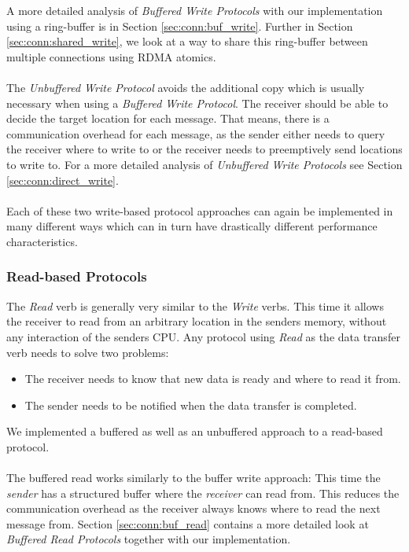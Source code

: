 A more detailed analysis of \emph{Buffered Write Protocols} with our implementation using a ring-buffer is in 
Section \ref{sec:conn:buf_write}. Further in Section \ref{sec:conn:shared_write},
we look at a way to share this ring-buffer between multiple connections using RDMA atomics.


\paragraph{} The  \emph{Unbuffered Write Protocol} avoids the additional copy which is usually necessary when 
using a \emph{Buffered Write Protocol}. The receiver should be able to decide the target location for each message. 
That means, there is a communication overhead for each message, as the sender either needs to query the receiver where to 
write to or the receiver needs to preemptively send locations to write to.
For a more detailed analysis of \emph{Unbuffered Write Protocols} see Section \ref{sec:conn:direct_write}.


\paragraph{}Each of these two write-based protocol approaches can again be implemented in many different ways which can
in turn have drastically different performance characteristics. 


\subsubsection{Read-based Protocols}
The \emph{Read} verb is generally very similar to the \emph{Write} verbs. This time it allows the receiver to read from 
an arbitrary location in the senders memory, without any interaction of the senders CPU. Any protocol
using \emph{Read} as the data transfer verb needs to solve two problems:

\begin{itemize}
  \item The receiver needs to know that new data is ready and where to read it from.
  \item The sender needs to be notified when the data transfer is completed.
\end{itemize}

We implemented a buffered as well as an unbuffered approach to a read-based protocol. 


\paragraph{} The buffered read works similarly to the buffer write approach: This time the \emph{sender} has a structured buffer where the 
\emph{receiver} can read from. This reduces the communication overhead as the receiver always knows where to read the next 
message from. Section \ref{sec:conn:buf_read} contains a more detailed look at \emph{Buffered Read Protocols} together with 
our implementation.

